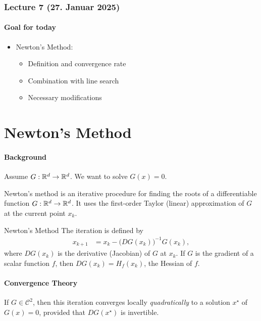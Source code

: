 \subsubsection{Lecture 7 (27. Januar 2025)}

\paragraph{Goal for today}
\begin{itemize}
    \item Newton's Method:
    \begin{itemize}
        \item Definition and convergence rate
        \item Combination with line search
        \item Necessary modifications
    \end{itemize}
\end{itemize}

\section*{Newton's Method}

\paragraph{Background}
Assume \(G: \mathbb{R}^d \to \mathbb{R}^d\). We want to solve \(G(x) = 0\).

Newton's method is an iterative procedure for finding the roots of a differentiable function \(G: \mathbb{R}^d \to \mathbb{R}^d\). 
It uses the first-order Taylor (linear) approximation of \(G\) at the current point \(x_k\).

\begin{definition}{Newton's Method}{}
    The iteration is defined by
    \begin{align*}
        x_{k+1} &= x_k - \bigl(D G(x_k)\bigr)^{-1} G(x_k),
    \end{align*}
    where \(D G(x_k)\) is the derivative (Jacobian) of \(G\) at \(x_k\). If \(G\) is the gradient of a scalar function \(f\), then \(DG(x_k) = H_f(x_k)\), the Hessian of \(f\).
\end{definition}

\paragraph{Convergence Theory}
If \(G\in \mathcal{C}^2\), then this iteration converges locally \emph{quadratically} to 
a solution \(x^\star\) of \(G(x) = 0\), provided that \(D G(x^\star)\) is invertible.

